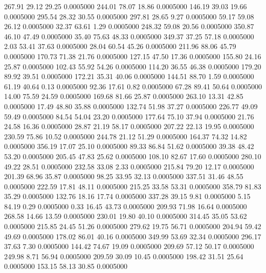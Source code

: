  267.91   29.12   29.25   0.0005000
 244.01   78.07   18.86   0.0005000
 146.19   39.03   19.66   0.0005000
 295.54   28.32   30.55   0.0005000
 297.81   28.65    9.27   0.0005000
  59.17   59.08   26.12   0.0005000
  32.37   63.61    1.29   0.0005000
 248.32   59.08   20.56   0.0005000
 350.87   46.10   47.49   0.0005000
  35.40   75.63   48.33   0.0005000
 349.37   37.25   57.18   0.0005000
   2.03   53.41   37.63   0.0005000
  28.04   60.54   45.26   0.0005000
 211.96   88.06   45.79   0.0005000
 170.73   71.38   21.76   0.0005000
 127.15   47.50   17.36   0.0005000
 155.80   24.16   25.87   0.0005000
 102.43   55.92   54.26   0.0005000
 114.20   36.55   46.38   0.0005000
 179.20   89.92   39.51   0.0005000
 172.21   35.31   40.06   0.0005000
 144.51   88.70    1.59   0.0005000
  61.19   40.64    0.13   0.0005000
  92.36   17.61    0.82   0.0005000
  67.28   89.41   50.64   0.0005000
  14.00   75.59   24.59   0.0005000
 169.68   81.66   25.87   0.0005000
 263.10   13.31   42.85   0.0005000
  17.49   48.80   35.88   0.0005000
 132.74   51.98   37.27   0.0005000
 226.77   49.09   59.49   0.0005000
  84.54   54.04   23.20   0.0005000
 177.64   75.10   37.94   0.0005000
  21.76   24.58   16.36   0.0005000
  28.87   21.19   58.17   0.0005000
 207.22   22.13   19.95   0.0005000
 230.59   75.86   10.52   0.0005000
 244.78   21.12   51.29   0.0005000
 164.37   74.32   14.82   0.0005000
 356.19   17.07   25.10   0.0005000
  89.33   86.84   51.62   0.0005000
  39.38   48.42   53.20   0.0005000
 205.45   47.83   25.62   0.0005000
 108.10   82.67   17.60   0.0005000
 280.10   49.22   28.51   0.0005000
 232.58   33.08    2.33   0.0005000
 215.84   79.20   12.17   0.0005000
 201.39   68.96   35.87   0.0005000
  98.25   33.95   32.13   0.0005000
 337.51   31.46   48.55   0.0005000
 222.59   17.81   48.11   0.0005000
 215.25   33.58   53.31   0.0005000
 358.79   81.83   35.29   0.0005000
 132.76   18.16   17.74   0.0005000
 337.28   39.15    9.81   0.0005000
   5.15   84.19    0.29   0.0005000
   0.33   16.45   43.73   0.0005000
 209.93   71.98   16.64   0.0005000
 268.58   14.66   13.59   0.0005000
 230.01   19.80   40.10   0.0005000
 314.45   35.05   53.62   0.0005000
 215.85   24.45   51.26   0.0005000
 279.62   19.75   56.71   0.0005000
 204.94   59.42   49.69   0.0005000
 178.02   86.01   40.16   0.0005000
 349.99   53.69   32.34   0.0005000
 296.17   37.63    7.30   0.0005000
 144.42   74.67   19.09   0.0005000
 209.69   57.12   50.17   0.0005000
 249.98    8.71   56.94   0.0005000
 209.59   30.09   10.45   0.0005000
 198.42   31.51   25.64   0.0005000
 153.15   58.13   30.85   0.0005000
